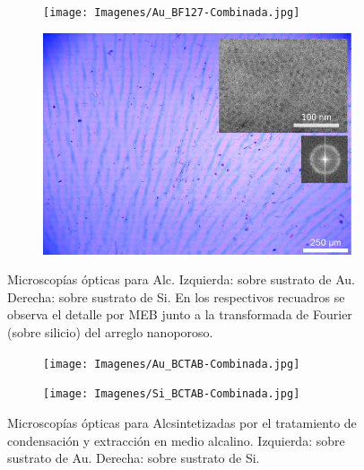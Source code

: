     	

    		\begin{figure}
 	   	    \begin{subfigure}{0.495\textwidth}
	       	\texttt{[image: Imagenes/Au\_BF127-Combinada.jpg]}
	   		\end{subfigure}
	   		\begin{subfigure}{0.495\textwidth}
	   	    \includegraphics[width=\textwidth]{Imagenes/Si_BF127-Combinada.jpg}
	   		\end{subfigure}
			 \caption[Microscopía óptica \pdmF tratamiento en medio alcalino.]{Microscopías ópticas para Alc\pdmF. Izquierda: sobre sustrato de Au. Derecha: sobre sustrato de Si. En los respectivos recuadros se observa el detalle por MEB junto a la transformada de Fourier (sobre silicio) del arreglo nanoporoso.}
			 \label{fig:Microscopia_F127_basico}	
		     \end{figure}

			\begin{figure}
 	   	    \begin{subfigure}{0.495\textwidth}
	       	\texttt{[image: Imagenes/Au\_BCTAB-Combinada.jpg]}
	   		\end{subfigure}
	   		\begin{subfigure}{0.495\textwidth}
	   	    \texttt{[image: Imagenes/Si\_BCTAB-Combinada.jpg]}
	   		\end{subfigure}
			 \caption[Microscopía óptica \pdmC tratamiento en medio alcalino.]{Microscopías ópticas para Alc\pdmC\space sintetizadas por el tratamiento de condensación y extracción en medio alcalino. Izquierda: sobre sustrato de Au. Derecha: sobre sustrato de Si.}
			 \label{fig:Microscopia_CTAB_basico}	
		     \end{figure}		

